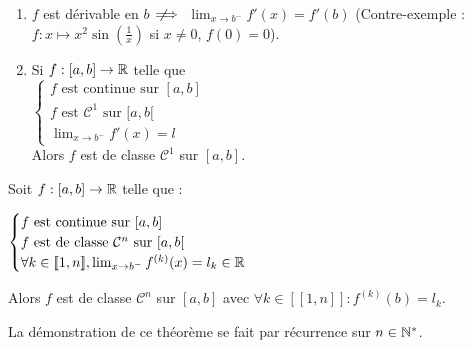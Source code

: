 \documentclass[12pt, a4paper]{report}
\begin{document}
\begin{remark}
    \begin{enumerate}
        \item $f$ est dérivable en $b$ $\;\not\!\!\!\implies$ $\lim_{x\to b^-}f'(x)= f'(b)$ (Contre-exemple : $f:x\mapsto x^2\sin(\frac{1}{x})$ si $x\not=0$, $f(0)=0$).
        \item Si $f:[a,b]\to \mathbb{R}$ telle que\\$\begin{cases}
            f \text{ est continue sur } [a,b]\\
            f \text{ est } \mathcal{C}^1 \text{ sur } [a,b[\\
            \lim_{x\to b^-}f'(x)=l
        \end{cases}$\\Alors $f$ est de classe $\mathcal{C}^1$ sur $[a,b]$.
    \end{enumerate}
\end{remark}

\begin{theorem}
    Soit $f : [a,b] \to \mathbb{R}$ telle que :

    $\begin{cases}
        f \text{ est continue sur } [a,b]\\
        f \text{ est de classe } \mathcal{C}^n \text{ sur } [a,b[\\
        \forall k \in [\![1,n]\!], \lim_{x \to b^-} f^{(k)}(x)=l_k\in\mathbb{R}
    \end{cases}$

    Alors $f$ est de classe $\mathcal{C}^n$ sur $[a,b]$ avec $\forall k \in [\![1,n]\!]: f^{(k)}(b)=l_k$.

    La démonstration de ce théorème se fait par récurrence sur $n\in\mathbb{N}^*$.
\end{theorem}
\end{document}
